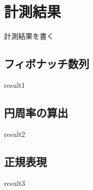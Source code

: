 \chapter{計測結果}
\label{cha:result}
計測結果を書く
\section{フィボナッチ数列}
result1
\section{円周率の算出}
result2
\section{正規表現}
result3